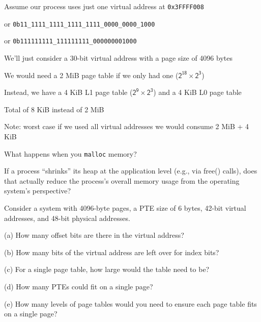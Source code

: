 \begin{slide}


    Assume our process uses just one virtual address at \texttt{0x3FFFF008}

    \leftspace{}or \texttt{0b11\_1111\_1111\_1111\_1111\_0000\_0000\_1000}

    \leftspace{}or \texttt{0b111111111\_111111111\_000000001000}
    \medskip

    We'll just consider a 30-bit virtual address with a page size of 4096 bytes

    \leftspace{}We would need a 2 MiB page table if we only had one
    ($\mathsf{2^{18} \times 2^{3}}$)
    \medskip

    Instead, we have a 4 KiB L1 page table ($\mathsf{2^9 \times 2^{3}}$) and a 4
    KiB L0 page table

    \leftspace{}Total of 8 KiB instead of 2 MiB
    \medskip

    Note: worst case if we used all virtual addresses we would consume 2 MiB + 4
    KiB

\end{slide}

\begin{slide}

	
	What happens when you \texttt{malloc} memory?
	\vspace{3mm}
	
	If a process “shrinks” its heap at the application level (e.g., via free() calls), does that actually reduce the process’s overall memory usage from the operating system’s perspective?

\end{slide}

\begin{slide}

	
	Consider a system with 4096-byte pages, a PTE size of 6 bytes, 42-bit virtual addresses, and 48-bit physical addresses.
	
	\bigskip
	
	(a) How many offset bits are there in the virtual address?
	
	\medskip
	
	(b) How many bits of the virtual address are left over for index bits?
	
	\medskip
	
	(c) For a single page table, how large would the table need to be? 
		
	\medskip
	
	(d) How many PTEs could fit on a single page?
	
	\medskip
	
	(e) How many levels of page tables would you need to ensure each page table fits on a single page?
	
\end{slide}

